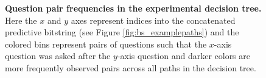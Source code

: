 \documentclass[12pt]{article}
\begin{document}
\begin{figure}
  \centering
  \caption{\textbf{Question pair frequencies in the experimental
      decision tree.} Here the $x$ and $y$ axes represent indices into
    the concatenated predictive bitstring (see Figure
    \ref{fig:bs_examplepaths}) and the colored bins represent pairs of
    questions such that the $x$-axis question was asked after the
    $y$-axis question and darker colors are more frequently observed
    pairs across all paths in the decision tree.}
  \label{fig:bs_jumpcounts}
\end{figure}
\end{document}
